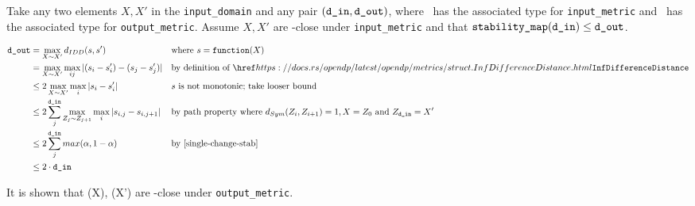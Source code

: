\documentclass{article}
\begin{document}
Take any two elements $X, X'$ in the \texttt{input\_domain} and any pair $(\texttt{d\_in}, \texttt{d\_out})$, 
where \din\ has the associated type for \texttt{input\_metric} and \dout\ has the associated type for \texttt{output\_metric}.
Assume $X, X'$ are \din-close under \texttt{input\_metric} and that $\texttt{stability\_map}(\texttt{d\_in}) \leq \texttt{d\_out}$. 

\begin{align*}
    \dout &= \max\limits_{X \sim X'} d_{IDD}(s, s') &&\text{where } s = \function(X)\\
    &= \max\limits_{X \sim X'} \max\limits_{ij} |(s_i - s'_i) - (s_j - s'_j)| &&\text{by definition of }\rustdoc{metrics/struct}{InfDifferenceDistance} \\
    &\leq 2 \max\limits_{X \sim X'} \max\limits_{i} |s_i - s'_i| &&\text{$s$ is not monotonic; take looser bound}\\
    &\leq 2 \sum_j^{\din} \max\limits_{Z_{j} \sim Z_{j+1}} \max\limits_{i} |s_{i,j} - s_{i,j+1}| &&\text{by path property where } d_{Sym}(Z_i, Z_{i+1}) = 1, X = Z_0 \text{ and } Z_\din = X' \\
    &\leq 2 \sum_j^{\din} max(\alpha, 1 - \alpha) &&\text{by \ref{single-change-stab}} \\
    &\leq 2 \cdot \din \\
\end{align*}


It is shown that \function(X), \function(X') are \dout-close under \texttt{output\_metric}.




\end{document}
